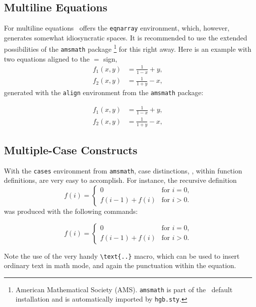 \subsection{Multiline Equations}

For multiline equations \latex\ offers the \verb!eqnarray! environment, which, however,
generates somewhat idiosyncratic spaces. It is recommended to use the extended
possibilities of the \texttt{amsmath} package%
\footnote{American Mathematical Society (AMS). \texttt{amsmath} is part of the 
\latex\ default installation and is automatically imported by \texttt{hgb.sty}.}
for this right away. Here is an example with two equations aligned to the $=$ sign,
%
\begin{align}
	f_1 (x,y) &= \frac{1}{1-x} + y , \label{eq:f1} \\
	f_2 (x,y) &= \frac{1}{1+y} - x , \label{eq:f2}
\end{align}
%
generated with the \texttt{align} environment from the \texttt{amsmath} package:
%
\begin{LaTeXCode}[numbers=none]
\begin{align}
  f_1 (x,y) &= \frac{1}{1-x} + y , \label{eq:f1} \\
  f_2 (x,y) &= \frac{1}{1+y} - x , \label{eq:f2}
\end{align}
\end{LaTeXCode}


\subsection{Multiple-Case Constructs}

With the \texttt{cases} environment from \texttt{amsmath}, case distinctions, 
\eg, within function definitions, are very easy to accomplish.
For instance, the recursive definition
%
\begin{equation}
	f(i) =
	\begin{cases}
		0             & \text{for $i = 0$,}\\
		f(i-1) + f(i) & \text{for $i > 0$.}
	\end{cases}
\end{equation}%
%
was produced with the following commands:
%
\begin{LaTeXCode}[numbers=none]
\begin{equation}
	f(i) =
	\begin{cases}
	  0             & \text{for $i = 0$,}\\
	  f(i-1) + f(i) & \text{for $i > 0$.}
	\end{cases}
\end{equation}
\end{LaTeXCode}
%
Note the use of the very handy \verb!\text{..}! macro, which can be used
to insert ordinary text in math mode, and again the punctuation within the
equation.


